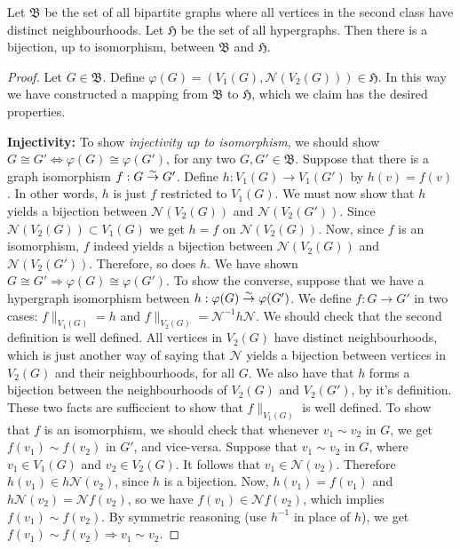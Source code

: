 \begin{lemma}
Let $\mathfrak{B}$ be the set of all bipartite graphs where all vertices in the second class have distinct neighbourhoods.
Let $\mathfrak{H}$ be the set of all hypergraphs.
Then there is a bijection, up to isomorphism, between $\mathfrak{B}$ and $\mathfrak{H}$.
\end{lemma}
\begin{proof}
Let $G \in \mathfrak{B}$. Define $\varphi(G) = (V_1(G), \mathcal{N}(V_2(G))) \in \mathfrak{H}$.
In this way we have constructed a mapping from $\mathfrak{B}$ to $\mathfrak{H}$, which we claim has the desired properties.

\textbf{Injectivity:}
To show \emph{injectivity up to isomorphism}, we should show $G \cong G' \Leftrightarrow \varphi(G) \cong \varphi(G')$, for any two $G,G' \in \mathfrak{B}$.
Suppose that there is a graph isomorphism $f: G \overset\sim\to G'$.
Define $h: V_1(G) \rightarrow V_1(G')$ by $h(v) = f(v)$. In other words, $h$ is just $f$ restricted to $V_1(G)$.
We must now show that $h$ yields a bijection between $\mathcal{N}(V_2(G))$ and $\mathcal{N}(V_2(G'))$.
Since $\mathcal{N}(V_2(G)) \subset V_1(G)$ we get $h = f$ on $\mathcal{N}(V_2(G))$.
Now, since $f$ is an isomorphism, $f$ indeed yields a bijection between $\mathcal{N}(V_2(G))$ and $\mathcal{N}(V_2(G'))$. Therefore, so does $h$.
We have shown $G \cong G' \Rightarrow \varphi(G) \cong \varphi(G')$.
To show the converse, suppose that we have a hypergraph isomorphism between $h: \varphi(G) \overset\sim\to \varphi(G')$.
We define $f: G \rightarrow G'$ in two cases: $f \|_{V_1(G)} = h$ and $f \|_{V_2(G)} = \mathcal{N}^{-1} h \mathcal{N}$.
We should check that the second definition is well defined. All vertices in $V_2(G)$ have distinct neighbourhoods, which is just another way of saying that $\mathcal{N}$ yields a bijection between vertices in $V_2(G)$ and their neighbourhoods, for all $G$. We also have that $h$ forms a bijection between the neighbourhoods of $V_2(G)$ and $V_2(G')$, by it's definition. These two facts are sufficcient to show that $f \|_{V_1(G)}$ is well defined.
To show that $f$ is an isomorphism, we should check that whenever $v_1 \sim v_2$ in $G$, we get $f(v_1) \sim f(v_2)$ in $G'$, and vice-versa.
Suppose that $v_1 \sim v_2$ in $G$, where $v_1 \in V_1(G)$ and $v_2 \in V_2(G)$. It follows that $v_1 \in \mathcal{N}(v_2)$.
Therefore $h(v_1) \in h \mathcal{N}( v_2 )$, since $h$ is a bijection.
Now, $h(v_1) = f(v_1)$ and $h \mathcal{N} (v_2) = \mathcal{N} f (v_2) $, so we have $f(v_1) \in \mathcal{N} f (v_2)$, which implies $f(v_1) \sim f(v_2)$.
By symmetric reasoning (use $h^{-1}$ in place of $h$), we get $f(v_1) \sim f(v_2) \Rightarrow v_1 \sim v_2$.


\end{proof}
